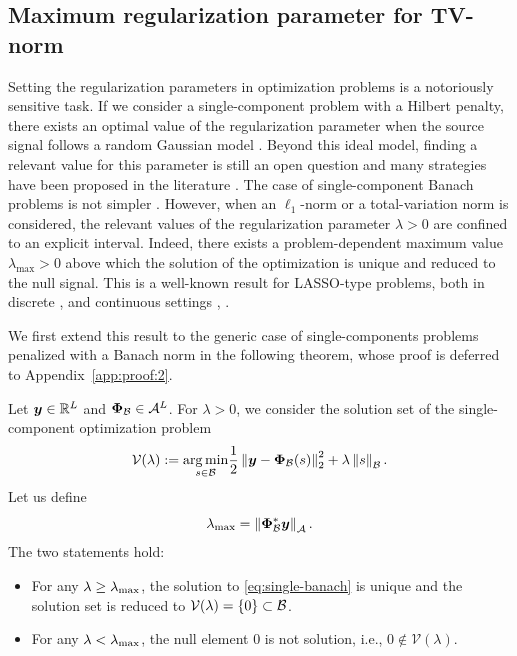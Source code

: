 \documentclass[12pt]{article}
\begin{document}
    \subsection{Maximum regularization parameter for TV-norm}

    Setting the regularization parameters in optimization problems is a notoriously sensitive task. 
    If we consider a single-component problem with a Hilbert penalty, there exists an optimal value of the regularization parameter when the source signal follows a random Gaussian model \cite{Badou}. Beyond this ideal model, finding a relevant value for this parameter is still an open question and many strategies have been proposed in the literature \cite{hansen2000,park2008parameter}. The case of single-component Banach problems is not simpler \cite{deladalle2014sugar,chirinos2024parameter}. 
    However, when an $\ell_1$-norm or a total-variation norm is considered, the relevant values of the regularization parameter $\lambda > 0$ are confined to an explicit interval. Indeed, there exists a problem-dependent maximum value $\lambda_{\mathrm{max}} > 0$ above which the solution of the optimization is unique and reduced to the null signal. This is a well-known result for LASSO-type problems, both in discrete \cite{tibshirani2013lasso}, \cite[Proposition~II.1]{koulouri2021} and continuous settings \cite[Proposition~10]{debarre2022sparsest}, \cite[Proposition~4.3]{jarret_grid_2025}.

    We first extend this result to the generic case of single-components problems penalized with a Banach norm in the following theorem, whose proof is deferred to Appendix~\ref{app:proof:2}.
    \begin{theorem}
    \label{prop:single-lmax}
    Let $\bm{y}\in \mathbb{R}^L$ and $\bm{\Phi}_\mathcal{B} \in \mathcal{A}^L$.
    For $\lambda >0$, we consider the solution set of the single-component optimization problem
    \begin{equation}
        \label{eq:single-banach}
        \mathcal{V}(\lambda) := \underset{s \in \mathcal{B}}{\arg \min} \frac{1}{2} \left\lVert\bm{y} - \bm{\Phi}_\mathcal{B}(s)\right\rVert_2^2 + \lambda \left\lVert s\right\rVert_{\mathcal{B}}.
    \end{equation}
    Let us define
    \begin{equation}
        \lambda_{\mathrm{max}} = \left\lVert\bm{\Phi}_\mathcal{B}^{*}\bm{y}\right\rVert_{\mathcal{A}}.
    \end{equation}
    The two statements hold:
    \begin{itemize}
        \item[1.] \label{item:lm:1} For any $\lambda \geq \lambda_\mathrm{max}$, the solution to \eqref{eq:single-banach} is unique and the solution set is reduced to $\mathcal{V}(\lambda) = \left\{0\right\} \subset \mathcal{B}$.
        \item[2.] \label{item:lm:2} For any $\lambda < \lambda_\mathrm{max}$, the null element $0$ is not solution, i.e., $0 \notin \mathcal{V}(\lambda)$.
    \end{itemize}
    \end{theorem}
\end{document}
